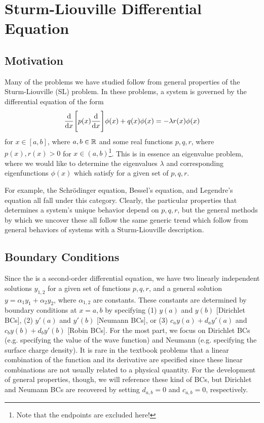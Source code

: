 \chapter{Sturm-Liouville Differential Equation}

\section{Motivation}

Many of the problems we have studied follow from general properties of the Sturm-Liouville (SL) problem.
In these problems, a system is governed by the differential equation of the form 
\begin{eqnarray}
    \label{eq:SL-DE}
    \dv{x}\Bigg[ p(x) \dv{x} \Bigg] \phi(x) + q(x) \phi(x) =  -\lambda r(x) \phi(x)
\end{eqnarray}
for $x \in [a,b]$, where $a,b \in \mathbb{R}$ and some real functions $p,q,r$, where $p(x),r(x) > 0$ for $x \in (a,b)$\footnote{Note that the endpoints are excluded here!}.
This is in essence an eigenvalue problem, where we would like to determine the eigenvalues $\lambda$ and corresponding eigenfunctions $\phi(x)$ which satisfy  for a given set of $p,q,r$.

For example, the Schr\"{o}dinger equation, Bessel's equation, and Legendre's equation all fall under this category.
Clearly, the particular properties that determines a system's unique behavior depend on $p,q,r$, but the general methods by which we uncover these all follow the same generic trend which follow from general behaviors of systems with a Sturm-Liouville description.


\section{Boundary Conditions}

Since the  is a second-order differential equation, we have two linearly independent solutions $y_{1,2}$ for a given set of functions $p,q,r$, and a general solution $y = \alpha_1 y_1 + \alpha_2 y_2$, where $\alpha_{1,2}$ are constants.
These constants are determined by boundary conditions at $x=a,b$ by specifying (1) $y(a)$ and $y(b)$ [Dirichlet BCs], (2) $y'(a)$ and $y'(b)$ [Neumann BCs], or (3) $c_a y(a) + d_{a} y'(a)$ and $c_{b} y(b) + d_{b}y'(b)$ [Robin BCs].
For the most part, we focus on Dirichlet BCs (e.g. specifying the value of the wave function) and Neumann (e.g. specifying the surface charge density).
It is rare in the textbook problems that a linear combination of the function and its derivative are specified since these linear combinations are not usually related to a physical quantity.
For the development of general properties, though, we will reference these kind of BCs, but Dirichlet and Neumann BCs are recovered by setting $d_{a,b} = 0$ and $c_{a,b} = 0$, respectively.

